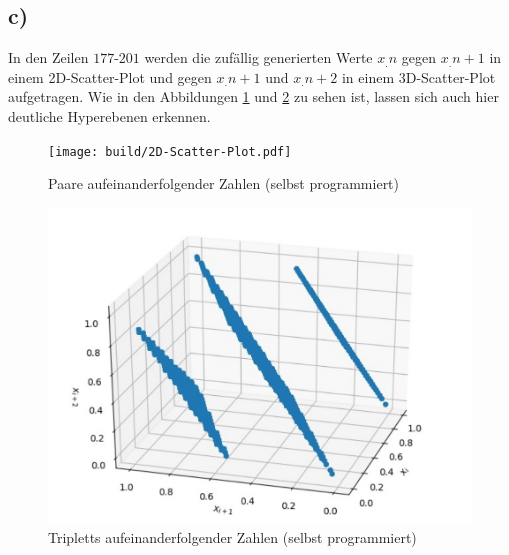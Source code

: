 \subsection*{c)}
In den Zeilen $177$-$201$ werden die zufällig generierten Werte $x_.n$ gegen $x_.{n+1}$ in einem 2D-Scatter-Plot und gegen $x_.{n+1}$ und $x_.{n+2}$ in einem 3D-Scatter-Plot aufgetragen. Wie in den Abbildungen \ref{fig:2D} und \ref{fig:3D} zu sehen ist, lassen sich auch hier deutliche Hyperebenen erkennen.
\begin{figure}
  \texttt{[image: build/2D-Scatter-Plot.pdf]}
  \caption{Paare aufeinanderfolgender Zahlen (selbst programmiert)}
  \label{fig:2D}
\end{figure}
\begin{figure}
  \includegraphics{3D-Scatter-Plot-gedreht.pdf}
  \caption{Tripletts aufeinanderfolgender Zahlen (selbst programmiert)}
  \label{fig:3D}
\end{figure}
